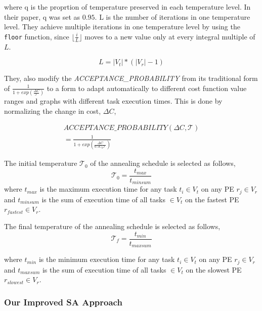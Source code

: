 where q is the proprtion of temperature preserved in each temperature level. In
their paper, q was set as $0.95$. L is the number of iterations in one
temperature level. They achieve multiple iterations in one temperature level by
using the \texttt{floor} function, since $\lfloor \frac{i}{L} \rfloor$ moves to
a new value only at every integral multiple of $L$.

\begin{equation}
L = |V_t|*(|V_r| - 1)
\end{equation}

They, also modify the \textit{ACCEPTANCE\_PROBABILITY} from its traditional form
of $\frac{1}{1+exp(\frac{\Delta C}{\mathcal{T}})}$ to a form to adapt
automatically to different cost function value ranges and graphs with different
task execution times. This is done by normalizing the change in cost, $\Delta
C$,

\begin{equation}
  \begin{array}{c}
    ACCEPTANCE\_PROBABILITY(\Delta C, \mathcal{T}) \\ 
    = \frac{1}{1+exp(\frac{\Delta C}{0.5C_0\mathcal{T}})}
  \end{array}
\end{equation}

The initial temperature $\mathcal{T}_0$ of the annealing schedule is selected as
follows,
\begin{equation}
\mathcal{T}_0 = \frac{t_{max}}{t_{minsum}}
\end{equation}
where $t_{max}$ is the maximum execution time for any task $t_i \in V_t$ on any
PE $r_j \in V_r$ and $t_{minsum}$ is the sum of execution time of all tasks $\in
V_t$ on the fastest PE $r_{fastest} \in V_r$.

The final temperature of the annealing schedule is selected as follows,
\begin{equation}
\mathcal{T}_f = \frac{t_{min}}{t_{maxsum}}
\end{equation}

where $t_{min}$ is the minimum execution time for any task $t_i \in V_t$
on any PE $r_j \in V_r$ and $t_{maxsum}$ is the sum of execution time of
all tasks $\in V_t$ on the slowest PE $r_{slowest} \in V_r$. %

\subsubsection{Our Improved SA Approach}

